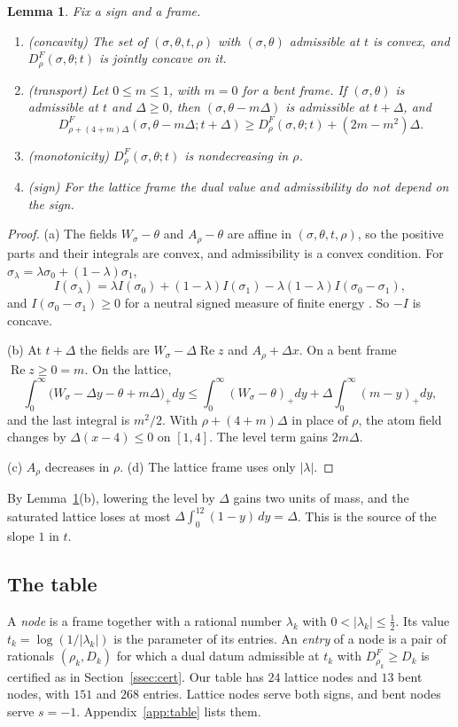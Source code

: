 \documentclass[11pt]{amsart}
\newtheorem{lemma}[theorem]{Lemma}
\theoremstyle{definition}
\theoremstyle{remark}
\numberwithin{equation}{section}
\begin{document}
\begin{lemma}\label{lem:U}
Fix a sign and a frame.
\begin{enumerate}[label=(\alph*)]
\item (concavity) The set of $(\sigma,\theta,t,\rho)$ with $(\sigma,\theta)$ admissible at $t$ is convex, and
 $D^F_\rho(\sigma,\theta;t)$ is jointly concave on it.
\item (transport) Let $0\le m\le1$, with $m=0$ for a bent frame. If $(\sigma,\theta)$ is admissible at $t$ and
 $\Delta\ge0$, then $(\sigma,\theta-m\Delta)$ is admissible at $t+\Delta$, and
 \[
  D^F_{\rho+(4+m)\Delta}(\sigma,\theta-m\Delta;t+\Delta)\ge D^F_\rho(\sigma,\theta;t)+(2m-m^2)\Delta .
 \]
\item (monotonicity) $D^F_\rho(\sigma,\theta;t)$ is nondecreasing in $\rho$.
\item (sign) For the lattice frame the dual value and admissibility do not depend on the sign.
\end{enumerate}
\end{lemma}

\begin{proof}
(a) The fields $W_\sigma-\theta$ and $A_\rho-\theta$ are affine in $(\sigma,\theta,t,\rho)$, so the positive parts and their
integrals are convex, and admissibility is a convex condition. For $\sigma_\lambda=\lambda\sigma_0+(1-\lambda)\sigma_1$,
\[
 I(\sigma_\lambda)=\lambda I(\sigma_0)+(1-\lambda)I(\sigma_1)-\lambda(1-\lambda)I(\sigma_0-\sigma_1),
\]
and $I(\sigma_0-\sigma_1)\ge0$ for a neutral signed measure of finite energy \cite[Lemma~I.1.8]{SaffTotik}. So $-I$ is
concave.

(b) At $t+\Delta$ the fields are $W_\sigma-\Delta\operatorname{Re}z$ and $A_\rho+\Delta x$. On a bent frame
$\operatorname{Re}z\ge0=m$. On the lattice,
\[
 \int_0^\infty\bigl(W_\sigma-\Delta y-\theta+m\Delta\bigr)_+dy\le\int_0^\infty(W_\sigma-\theta)_+dy+\Delta\int_0^\infty(m-y)_+dy ,
\]
and the last integral is $m^2/2$. With $\rho+(4+m)\Delta$ in place of $\rho$, the atom field changes by
$\Delta(x-4)\le0$ on $[1,4]$. The level term gains $2m\Delta$.

(c) $A_\rho$ decreases in $\rho$. (d) The lattice frame uses only $|\lambda|$.
\end{proof}

By Lemma~\ref{lem:U}(b), lowering the level by $\Delta$ gains two units of mass, and the saturated lattice loses at most
$\Delta\int_0^12(1-y)\,dy=\Delta$. This is the source of the slope $1$ in $t$.

\subsection{The table}
A \emph{node} is a frame together with a rational number $\lambda_k$ with $0<|\lambda_k|\le\frac12$. Its value
$t_k=\log(1/|\lambda_k|)$ is the parameter of its entries. An \emph{entry} of a node is a pair of rationals
$(\rho_k,D_k)$ for which a dual datum admissible at $t_k$ with $D^F_{\rho_k}\ge D_k$ is certified as in
Section~\ref{ssec:cert}. Our table has $24$ lattice nodes and $13$ bent nodes, with $151$ and $268$ entries. Lattice
nodes serve both signs, and bent nodes serve $s=-1$. Appendix~\ref{app:table} lists them.
\end{document}
